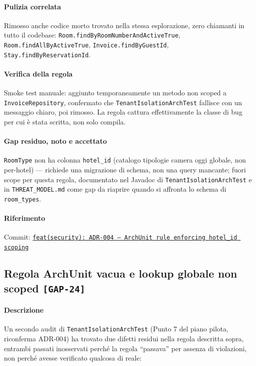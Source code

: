 ﻿\documentclass[a4paper,12pt]{report}
\newcommand{\commitref}[2]{\texttt{\small \href{https://github.com/diegoandruccioli/hotel-pms/commit/#1}{#2}}}
\newcommand{\threat}[1]{\texttt{\small\textcolor{vulnred}{[#1]}}}
\begin{document}
\paragraph{Pulizia correlata}
Rimosso anche codice morto trovato nella stessa esplorazione, zero
chiamanti in tutto il codebase: \texttt{Room.findByRoomNumberAndActiveTrue},
\texttt{Room.findAllByActiveTrue}, \texttt{Invoice.findByGuestId},
\texttt{Stay.findByReservationId}.

\paragraph{Verifica della regola}
Smoke test manuale: aggiunto temporaneamente un metodo non scoped a
\texttt{InvoiceRepository}, confermato che \texttt{TenantIsolationArchTest}
fallisce con un messaggio chiaro, poi rimosso. La regola cattura
effettivamente la classe di bug per cui è stata scritta, non solo compila.

\paragraph{Gap residuo, noto e accettato}
\texttt{RoomType} non ha colonna \texttt{hotel\_id} (catalogo tipologie
camera oggi globale, non per-hotel) --- richiede una migrazione di schema,
non una query mancante; fuori scope per questa regola, documentato nel
Javadoc di \texttt{TenantIsolationArchTest} e in \texttt{THREAT\_MODEL.md}
come gap da riaprire quando si affronta lo schema di \texttt{room\_types}.

\paragraph{Riferimento} Commit: \commitref{797d676}{feat(security): ADR-004 --- ArchUnit rule enforcing hotel\_id scoping}

\subsection{Regola ArchUnit vacua e lookup globale non scoped \threat{GAP-24}}

\paragraph{Descrizione}
Un secondo audit di \texttt{TenantIsolationArchTest} (Punto 7 del piano pilota, riconferma
ADR-004) ha trovato due difetti residui nella regola descritta sopra, entrambi passati
inosservati perché la regola ``passava'' per assenza di violazioni, non perché avesse
verificato qualcosa di reale:
\end{document}
